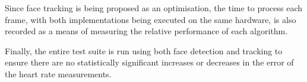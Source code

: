 Since face tracking is being proposed as an optimisation, the time to process each frame, with both implementations being executed on the same hardware, is also recorded as a means of measuring the relative performance of each algorithm.
\par
Finally, the entire test suite is run using both face detection and tracking to ensure there are no statistically significant increases or decreases in the error of the heart rate measurements.


